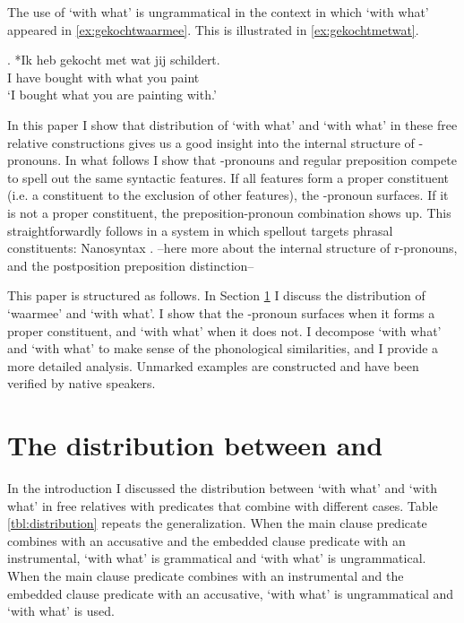 \documentclass[12pt]{article}
\begin{document}
The use of  `with what' is ungrammatical in the context in which  `with what' appeared in \ref{ex:gekochtwaarmee}. This is illustrated in \ref{ex:gekochtmetwat}.

\exg. *Ik heb gekocht met wat jij schildert.\\
 I have bought with what you paint\\
 `I bought what you are painting with.'\label{ex:gekochtmetwat}

In this paper I show that distribution of  `with what' and  `with what' in these free relative constructions gives us a good insight into the internal structure of -pronouns. In what follows I show that -pronouns and regular preposition compete to spell out the same syntactic features. If all features form a proper constituent (i.e. a constituent to the exclusion of other features), the -pronoun surfaces. If it is not a proper constituent, the preposition-pronoun combination shows up. This straightforwardly follows in a system in which spellout targets phrasal constituents: Nanosyntax \citep{starke2009}. --here more about the internal structure of r-pronouns, and the postposition preposition distinction--

This paper is structured as follows. In Section \ref{sec:distribution} I discuss the distribution of  `waarmee' and  `with what'. I show that the -pronoun surfaces when it forms a proper constituent, and  `with what' when it does not. I decompose  `with what' and  `with what' to make sense of the phonological similarities, and I provide a more detailed analysis. Unmarked examples are constructed and have been verified by native speakers.


\section{The distribution between  and }\label{sec:distribution}

In the introduction I discussed the distribution between  `with what' and  `with what' in free relatives with predicates that combine with different cases. Table \ref{tbl:distribution} repeats the generalization. When the main clause predicate combines with an accusative and the embedded clause predicate with an instrumental,  `with what' is grammatical and  `with what' is ungrammatical. When the main clause predicate combines with an instrumental and the embedded clause predicate with an accusative,  `with what' is ungrammatical and  `with what' is used.
\end{document}

